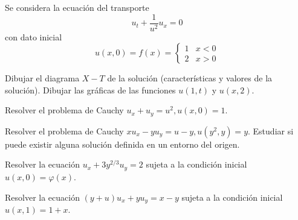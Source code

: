 \begin{problem}[4] Se considera la ecuación del transporte \[u_t + \frac{1}{u^2} u_x = 0\] con dato inicial \[u(x,0)=f(x) =
	\begin{cases}
	1 & x < 0 \\
	2 & x > 0
	\end{cases}\]
	
	Dibujar el diagrama $ X-T $ de la solución (características y valores de la solución). Dibujar las gráficas de las funciones $ u(1,t) $ y $ u(x,2) $.
	
\solution

\end{problem}









\begin{problem}[5]
	Resolver el problema de Cauchy $u_x + u_y = u^2, u(x,0) = 1$.

	\solution
\end{problem}











\begin{problem}[6]
	Resolver el problema de Cauchy $xu_x - yu_y = u - y, u(y^2,y)=y$. Estudiar si puede existir alguna solución definida en un entorno del origen.

	\solution
\end{problem}










\begin{problem}[7]
	Resolver la ecuación $u_x + 3y^{2/3} u_y = 2$ sujeta a la condición inicial $u(x,0) = φ(x)$.

	\solution

\end{problem}














\begin{problem}[8]
	Resolver la ecuación $(y + u)u_x + yu_y = x - y$ sujeta a la condición inicial $u(x,1) = 1 + x$.

	\solution
\end{problem}













